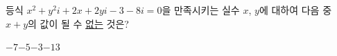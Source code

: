 등식 $x^2+y^2i+2x+2yi-3-8i=0$을 만족시키는 실수 $x$, $y$에 대하여 다음 중 $x+y$의 값이 될 수 \underline{없는} 것은?
\begin{choices32}{$-7$}{$-5$}{$-3$}{$-1$}{$3$}\end{choices32}
